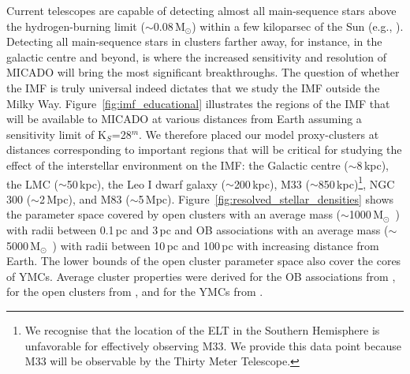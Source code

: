 \documentclass[referee]{aa}
\newcommand{\msun}{M$_\odot$~}
\newcommand{\msune}{M$_\odot$}
\newcommand{\s}{$\sim$}
\begin{document}
Current telescopes are capable of detecting almost all main-sequence stars above the hydrogen-burning limit (\s0.08\,\msune) within a few kiloparsec of the Sun (e.g., \citealt{muzic17}).
Detecting all main-sequence stars in clusters farther away, for instance, in the galactic centre and beyond, is where the increased sensitivity and resolution of MICADO will bring the most significant breakthroughs.
The question of whether the IMF is truly universal indeed dictates that we study the IMF outside the Milky Way.
Figure~\ref{fig:imf_educational} illustrates the regions of the IMF that will be available to MICADO at various distances from Earth assuming a sensitivity limit of K$_S$=28$^m$.
We therefore placed our model proxy-clusters at distances corresponding to important regions that will be critical for studying the effect of the interstellar environment on the IMF: the Galactic centre (\s8\,kpc), the LMC (\s50\,kpc), the Leo I dwarf galaxy (\s200\,kpc), M33 (\s850\,kpc)\footnote{We recognise that the location of the ELT in the Southern Hemisphere is unfavorable for effectively observing M33.
We provide this data point because M33 will be observable by the Thirty Meter Telescope.}, NGC 300 (\s2\,Mpc), and M83 (\s5\,Mpc).
Figure~\ref{fig:resolved_stellar_densities} shows the parameter space covered by open clusters with an average mass (\s1000\,\msun) with radii between 0.1\,pc and 3\,pc and OB associations with an average mass (\s5000\,\msun) with radii between 10\,pc and 100\,pc with increasing distance from Earth.
The lower bounds of the open cluster parameter space also cover the cores of YMCs. Average cluster properties were derived for the OB associations from \citet{melnik1995}, for the open clusters from \citet{piskunov2007}, and for the YMCs from \citet{portegies2010}.
\end{document}
